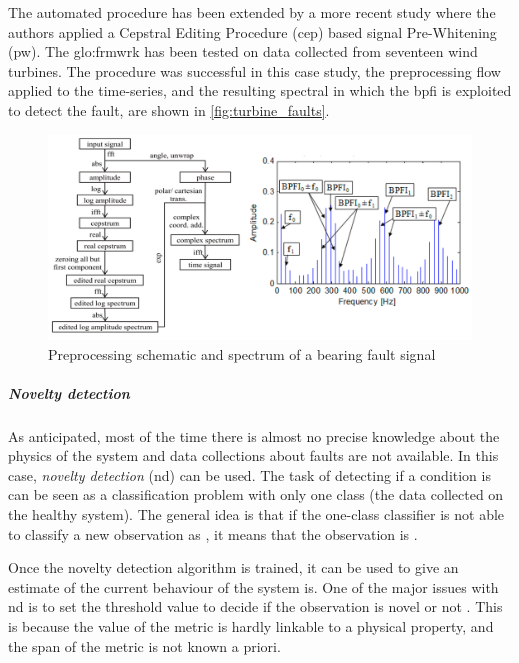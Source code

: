 The automated procedure \cite{sawalhi2008semi} has been extended by a more recent study \cite{schlechtingen2019automated} where the authors applied a Cepstral Editing Procedure (\gls{cep}) based signal Pre-Whitening (\gls{pw}). The \gls{glo:frmwrk} has been tested on data collected from seventeen wind turbines. The procedure was successful in this case study, the preprocessing flow applied to the time-series, and the resulting spectral in which the \gls{bpfi} is exploited to detect the fault, are shown in \autoref{fig:turbine_faults}.

\begin{figure}
    \centering
    \includegraphics[width=\textwidth]{images/StateArt/spectrum.png}
    \caption{Preprocessing schematic and spectrum of a bearing fault signal \cite{schlechtingen2019automated}}
    \label{fig:turbine_faults}
\end{figure}

\subparagraph*{Novelty detection}
As anticipated, most of the time there is almost no precise knowledge about the physics of the system and data collections about faults are not available. In this case, \emph{novelty detection} (\gls{nd}) can be used. The task of detecting if a condition is  can be seen as a classification problem with only one class (the data collected on the healthy system). The general idea is that if the one-class classifier is not able to classify a new observation as , it means that the observation is .

Once the novelty detection algorithm is trained, it can be used to give an estimate of  the current behaviour of the system is. One of the major issues with \gls{nd} is to set the threshold value to decide if the observation is novel or not \cite{NoveltyReview}. This is because the value of the metric is hardly linkable to a physical property, and the span of the metric is not known a priori.

